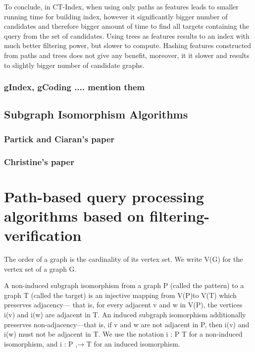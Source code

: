 \documentclass{l4proj}
\begin{document}
To conclude, in CT-Index, when using only paths as features leads to smaller running time for building index, however it significantly bigger number of candidates and therefore bigger amount of time to find all targets containing the query from the set of candidates. Using trees as features results to an index with much better filtering power, but slower to compute. Hashing features constructed from paths and trees does not give any benefit, moreover, it it slower and results to slightly bigger number of candidate graphs.\par

\subsection{gIndex, gCoding .... mention them}
\section{Subgraph Isomorphism Algorithms}
\subsection{Partick and Ciaran's paper}
\subsection{Christine's paper}

\chapter{Path-based query processing algorithms based on filtering-verification }

The order of a graph is the cardinality of its
vertex set. We write V(G) for the vertex set of a graph G.

A non-induced subgraph isomorphism from a graph P
(called the pattern) to a graph T (called the target) is an injective
mapping from V(P)to V(T) which preserves adjacency—
that is, for every adjacent v and w in V(P), the vertices i(v)
and i(w) are adjacent in T. An induced subgraph isomorphism
additionally preserves non-adjacency—that is, if v and
w are not adjacent in P, then i(v) and i(w) must not be adjacent
in T. We use the notation i : P  T for a non-induced
isomorphism, and i : P ,→ T for an induced isomorphism.
\end{document}
